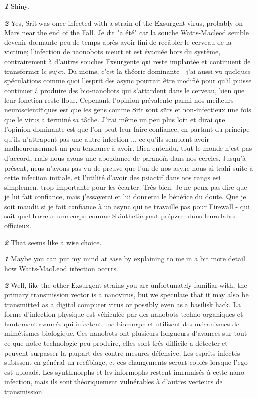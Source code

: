 \textbf{\textit{1}} Shiny. 

\textbf{\textit{2}} Yes, Srit was once infected with a strain of the Exsurgent virus, probably on Mars near the end of the Fall. Je dit "a été" car la souche Watts-Macleod semble devenir dormante peu de temps après avoir fini de recâbler le cerveau de la victime; l'infection de naonobots meurt et est évacuée hors du système, contrairement à d'autres souches Exsurgente qui reste implantée et continuent de transformer le sujet. Du moins, c'est la théorie dominante - j'ai aussi vu quelques spéculations comme quoi l'esprit des async pourrait être modifié pour qu'il puisse continuer à produire des bio-nanobots qui  s'attardent dans le cerveau, bien que leur fonction reste floue. Cepenant, l'opinion prévalente parmi nos meilleurs neuroscientifiques est que les gens comme Srit sont sûrs et non-infectieux une fois que le virus a terminé sa tâche. J'irai même un peu plus loin et dirai que l'opinion dominante est que l'on peut leur faire confiance, en partant du principe qu'ils n'attrapent pas une autre infection ... ce qu'ils semblent avoir malheureusemnet un peu tendance à avoir. Bien entendu, tout le monde n'est pas d'accord, mais nous avons une abondance de paranoïa dans nos cercles. Jusqu'à présent, nous n'avons pas vu de preuve que l'un de nos async nous ai trahi suite à cette infection initiale, et l'utilité d'avoir des psiactif dans nos rangs est simplement trop importante pour les écarter. Très bien. Je ne peux pas dire que je lui fait confiance, mais j'essayerai et lui donnerai le bénéfice du doute. Que je soit maudit si je fait confiance à un async qui ne travaille pas pour Firewall - qui sait quel horreur une corpo comme Skinthetic peut prépzrer dans leurs labos officieux. 

\textbf{\textit{2}} That seems like a wise choice. 

\textbf{\textit{1}} Maybe you can put my mind at ease by explaining to me in a bit more detail how Watts-MacLeod infection occurs. 

\textbf{\textit{2}} Well, like the other Exsurgent strains you are unfortunately familiar with, the primary transmission vector is a nanovirus, but we speculate that it may also be transmitted as a digital computer virus or possibly even as a basilisk hack. La forme d'infection physique est véhiculée par des nanobots techno-organiques et hautement avancés qui infectent une biomorph et utilisent des mécanismes de mimétismes biologique. Ces nanobots ont plusieurs longueurs d'avances sur tout ce que notre technologie peu produire, elles sont trés difficile a détecter et peuvent surpasser la plupart des contre-mesures défensive. Les esprits infectés subissent en général un recâblage, et ces changements seront copiés lorsque l'ego est uploadé. Les synthmorphs et les informophs restent immunisés à cette nano-infection, mais ils sont théoriquement vulnérables à d'autres vecteurs de transmission. 


